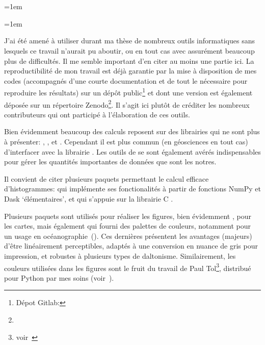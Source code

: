 
\chapter*{\bibname}
\mtcaddchapter[\bibname]
\markboth{\bibname}{}
\label{bib}

{
  \emergencystretch=1em
  \printbibliography[heading=none, filter=normal]
}

\unsection{\bibdataTitle}
\markright{\bibdataTitle}
\label{bib:data}

{
  \emergencystretch=1em
  \printbibliography[heading=none, type=dataset]
}

\unsection{\bibsoftwareTitle}
\markright{\bibsoftwareTitle}
\label{bib:software}

J'ai été amené à utiliser durant ma thèse de nombreux outils informatiques sans lesquels ce travail n'aurait pu aboutir, ou en tout cas avec assurément beaucoup plus de difficultés.
Il me semble important d'en citer au moins une partie ici.
La reproductibilité de mon travail est déjà garantie par la mise à disposition de mes codes (accompagnés d'une courte documentation et de tout le nécessaire pour reproduire les résultats) sur un dépôt public\footnote{%
  Dépot Gitlab: }
et dont une version est également déposée sur un répertoire Zenodo\footnote{}.
Il s'agit ici plutôt de créditer les nombreux contributeurs qui ont participé à l'élaboration de ces outils.

Bien évidemment beaucoup des calculs reposent sur des librairies qui ne sont plus à présenter: , , et .
Cependant il est plus commun (en géosciences en tout cas) d'interfacer avec la librairie .
Les outils de  se sont également avérés indispensables pour gérer les quantités importantes de données que sont les notres.

Il convient de citer plusieurs paquets permettant le calcul efficace d'histogrammes:
 qui implémente ses fonctionalités à partir de fonctions NumPy et Dask \enquote*{élémentaires}, et
 qui s'appuie sur la librairie C .

Plusieurs paquets sont utilisés pour réaliser les figures, bien évidemment ,
 pour les cartes,
mais également  qui fourni des palettes de couleurs, notamment pour un usage en océanographie~(\cite{thyng_2016}). Ces dernières présentent les avantages (majeurs) d'être linéairement perceptibles, adaptés à une conversion en nuance de gris pour impression, et robustes à plusieurs types de daltonisme.
Similairement, les couleurs utilisées dans les figures sont le fruit du travail de Paul Tol\footnote{voir~}, distribué pour Python par mes soins (voir~).

